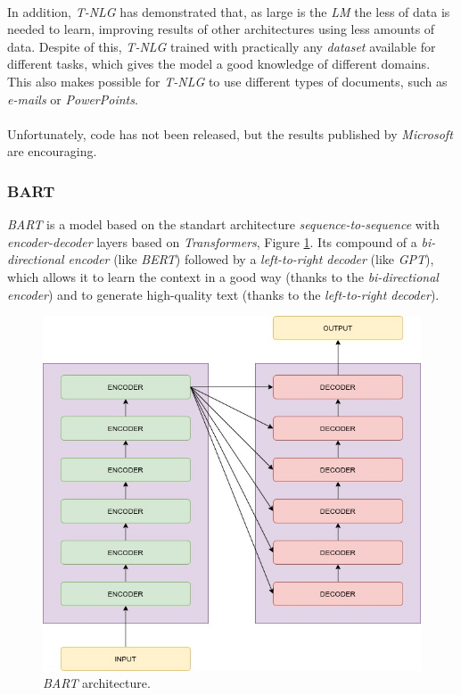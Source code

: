 \paragraph{}
In addition, \emph{T-NLG} has demonstrated that, as large is the \emph{LM} the less of data is needed to learn, improving results of other architectures using less amounts of data. Despite of this, \emph{T-NLG} trained with practically any \emph{dataset} available for different tasks, which gives the model a good knowledge of different domains. This also makes possible for \emph{T-NLG} to use different types of documents, such as \emph{e-mails} or \emph{PowerPoints}.
\paragraph{}
Unfortunately, code has not been released, but the results published by \emph{Microsoft} are encouraging.
\subsubsection{BART}
\noindent \emph{BART} is a model based on the standart architecture \emph{sequence-to-sequence} with \emph{encoder-decoder} layers based on \emph{Transformers}, Figure \ref{fig:bart}\cite{Lewis2019}. Its compound of a \emph{bi-directional encoder} (like \emph{BERT}) followed by a \emph{left-to-right decoder} (like \emph{GPT}), which allows it to learn the context in a good way (thanks to the \emph{bi-directional encoder}) and to generate high-quality text (thanks to the \emph{left-to-right decoder}).
\begin{figure}[h!]
	\centering
	\includegraphics[scale=0.35]{images/bart}
	\caption{\emph{BART} architecture.}
	\label{fig:bart}
\end{figure}
